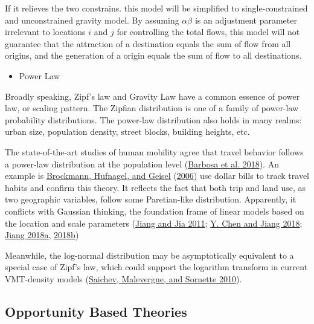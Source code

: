 \documentclass[
  11pt,
  openany]{memoir}
\providecommand{\tightlist}{%
  \setlength{\itemsep}{0pt}\setlength{\parskip}{0pt}}
\begin{document}
If it relieves the two constrains. this model will be simplified to single-constrained and unconstrained gravity model. By assuming \(\alpha\beta\) is an adjustment parameter irrelevant to locations \(i\) and \(j\) for controlling the total flows, this model will not guarantee that the attraction of a destination equals the sum of flow from all origins, and the generation of a origin equals the sum of flow to all destinations.

\begin{itemize}
\tightlist
\item
  Power Law
\end{itemize}

Broadly speaking, Zipf's law and Gravity Law have a common essence of power law, or scaling pattern. The Zipfian distribution is one of a family of power-law probability distributions. The power-law distribution also holds in many realms: urban size, population density, street blocks, building heights, etc.

The state-of-the-art studies of human mobility agree that travel behavior follows a power-law distribution at the population level (\protect\hyperlink{ref-barbosaHumanMobilityModels2018}{Barbosa et al. 2018}). An example is \protect\hyperlink{ref-brockmannScalingLawsHuman2006}{Brockmann, Hufnagel, and Geisel} (\protect\hyperlink{ref-brockmannScalingLawsHuman2006}{2006}) use dollar bills to track travel habits and confirm this theory. It reflects the fact that both trip and land use, as two geographic variables, follow some Paretian-like distribution. Apparently, it conflicts with Gaussian thinking, the foundation frame of linear models based on the location and scale parameters (\protect\hyperlink{ref-jiangZipfLawAll2011}{Jiang and Jia 2011}; \protect\hyperlink{ref-chenHierarchicalScalingSystems2018}{Y. Chen and Jiang 2018}; \protect\hyperlink{ref-jiangGeospatialAnalysisRequires2018}{Jiang 2018a}, \protect\hyperlink{ref-jiangSpatialHeterogeneityScale2018}{2018b})

Meanwhile, the log-normal distribution may be asymptotically equivalent to a special case of Zipf's law, which could support the logarithm transform in current VMT-density models (\protect\hyperlink{ref-saichevTheoryZipfLaw2010}{Saichev, Malevergne, and Sornette 2010}).

\hypertarget{opportunity-based-theories}{%
\subsection{Opportunity Based Theories}\label{opportunity-based-theories}}
\end{document}
